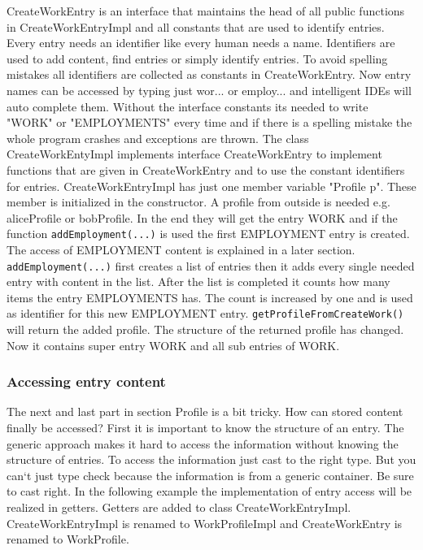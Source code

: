 \documentclass[12pt]{article}
\begin{document}
CreateWorkEntry is an interface that maintains the head of all public functions in CreateWorkEntryImpl and all constants that are used to identify entries. Every entry needs an identifier like every human needs a name. Identifiers are used to add content, find entries or simply identify entries. To avoid spelling mistakes all identifiers are collected as constants in CreateWorkEntry. Now entry names can be accessed by typing just wor... or employ... and intelligent IDEs will auto complete them. Without the interface constants its needed to write "WORK" or "EMPLOYMENTS" every time and if there is a spelling mistake the whole program crashes and exceptions are thrown. The class CreateWorkEntyImpl implements interface CreateWorkEntry to implement functions that are given in CreateWorkEntry and to use the constant identifiers for entries. CreateWorkEntryImpl has just one member variable "Profile p". These member is initialized in the constructor. A profile from outside is needed e.g. aliceProfile or bobProfile. In the end they will get the entry WORK and if the function {\tt addEmployment(...)} is used the first EMPLOYMENT entry is created. The access of EMPLOYMENT content is explained in a later section.  {\tt addEmployment(...)} first creates a list of entries then it adds every single needed entry with content in the list. After the list is completed it counts how many items the entry EMPLOYMENTS has. The count is increased by one and is used as identifier for this new EMPLOYMENT entry.  {\tt getProfileFromCreateWork()} will return the added profile. The structure of the returned profile has changed. Now it contains super entry WORK and all sub entries of WORK.

\subsubsection{Accessing entry content}
The next and last part in section Profile is a bit tricky. How can stored content finally be accessed? First it is important to know the structure of an entry. The generic approach makes it hard to access the information without knowing the structure of entries. To access the information just cast to the right type. But you can`t just type check because the information is from a generic container. Be sure to cast right. In the following example the implementation of entry access will be realized in getters. Getters are added to class CreateWorkEntryImpl. CreateWorkEntryImpl is renamed to WorkProfileImpl and CreateWorkEntry is renamed to WorkProfile.
\end{document}
